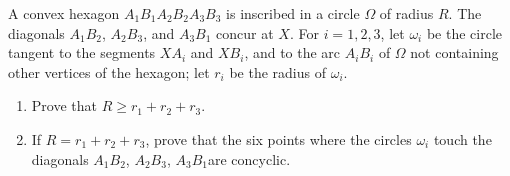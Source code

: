 A convex hexagon $A_1B_1A_2B_2A_3B_3$ is inscribed in a circle $\Omega$ of radius $R$. The diagonals $A_1B_2$, $A_2B_3$, and $A_3B_1$ concur at $X$. For $i=1,2,3$, let $\omega_i$ be the circle tangent to the segments $XA_i$ and $XB_i$, and to the arc $A_iB_i$ of $\Omega$ not containing other vertices of the hexagon; let $r_i$ be the radius of $\omega_i$.
\begin{enumerate}[label=(\alph*)]
	\item Prove that $R\geq r_1+r_2+r_3$.
	\item If $R=r_1+r_2+r_3$, prove that the six points where the circles $\omega_i$ touch the diagonals $A_1B_2$, $A_2B_3$, $A_3B_1$are concyclic.
\end{enumerate}